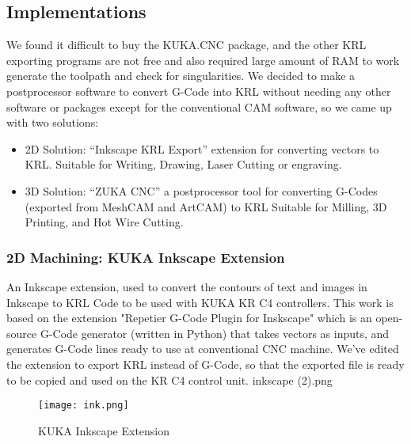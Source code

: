 \subsection{ Implementations }

We found it difficult to buy the KUKA.CNC package, and the other KRL exporting programs are not free and also required large amount of RAM to work generate the toolpath and check for singularities. We decided to make a postprocessor software to convert G-Code into KRL without needing any other software or packages except for the conventional CAM software, so we came up with two solutions:
\begin{itemize}
	\item 2D Solution: “Inkscape KRL Export” extension for converting vectors to KRL.
	\newline 
	\small Suitable for Writing, Drawing, Laser Cutting or engraving.
	\item \normalsize 3D Solution: “ZUKA CNC” a postprocessor tool for converting G-Codes (exported from MeshCAM and ArtCAM) to KRL
	\newline
	\small Suitable for Milling, 3D Printing, and Hot Wire Cutting. 
	
\end{itemize}
\subsubsection{2D Machining: KUKA Inkscape Extension}

An Inkscape extension, used to convert the contours of text and images in Inkscape to KRL Code to be used with KUKA KR C4 controllers. This work is based on the extension "Repetier G-Code Plugin for Inskscape" which is an open-source G-Code generator (written in Python) that takes vectors as inputs, and generates G-Code lines ready to use at conventional CNC machine. We’ve edited the extension to export KRL instead of G-Code, so that the exported file is ready to be copied and used on the KR C4 control unit.
inkscape (2).png
\begin{figure}[H]
	\centering
	\caption{KUKA Inkscape Extension}
	\texttt{[image: ink.png]}
\end{figure}

